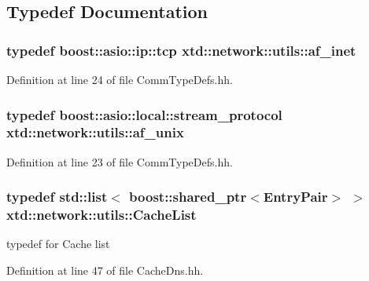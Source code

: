 \subsection{Typedef Documentation}
\hypertarget{namespacextd_1_1network_1_1utils_a6238bab7a616eda8c9424721444a18d1}{
\subsubsection[{af\-\_\-inet}]{\setlength{\rightskip}{0pt plus 5cm}typedef boost\-::asio\-::ip\-::tcp {\bf xtd\-::network\-::utils\-::af\-\_\-inet}}}\label{namespacextd_1_1network_1_1utils_a6238bab7a616eda8c9424721444a18d1}


Definition at line 24 of file Comm\-Type\-Defs.\-hh.

\hypertarget{namespacextd_1_1network_1_1utils_a60e83921a2d026f07b49fa094988acdf}{
\subsubsection[{af\-\_\-unix}]{\setlength{\rightskip}{0pt plus 5cm}typedef boost\-::asio\-::local\-::stream\-\_\-protocol {\bf xtd\-::network\-::utils\-::af\-\_\-unix}}}\label{namespacextd_1_1network_1_1utils_a60e83921a2d026f07b49fa094988acdf}


Definition at line 23 of file Comm\-Type\-Defs.\-hh.

\hypertarget{namespacextd_1_1network_1_1utils_a6eef494cdc6ca2b10bf4f36f6fa110ee}{
\subsubsection[{Cache\-List}]{\setlength{\rightskip}{0pt plus 5cm}typedef std\-::list$<$ boost\-::shared\-\_\-ptr$<${\bf Entry\-Pair}$>$ $>$ {\bf xtd\-::network\-::utils\-::\-Cache\-List}}}\label{namespacextd_1_1network_1_1utils_a6eef494cdc6ca2b10bf4f36f6fa110ee}


typedef for Cache list 



Definition at line 47 of file Cache\-Dns.\-hh.

